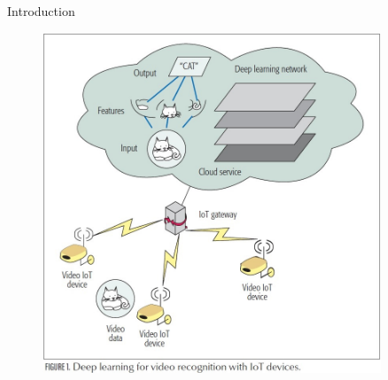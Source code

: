 \documentclass[final]{beamer}
\newlength{\sepwid}
\newlength{\onecolwid}
\newlength{\twocolwid}
\begin{document}
\begin{frame}
\begin{columns}[t]
\begin{column}{\onecolwid}
\begin{exampleblock}{Introduction}

\end{exampleblock}


\begin{figure}
\includegraphics[width=0.8\linewidth]{Resources/Figura-1.jpg}
\end{figure}


\end{column} %

\begin{column}{\sepwid}\end{column} %

\begin{column}{\twocolwid} %

\begin{columns}[t,totalwidth=\twocolwid] %

\begin{column}{\onecolwid}\vspace{-.74in} %



\end{column}
\end{columns}
\end{column}
\end{columns}
\end{frame}
\end{document}
